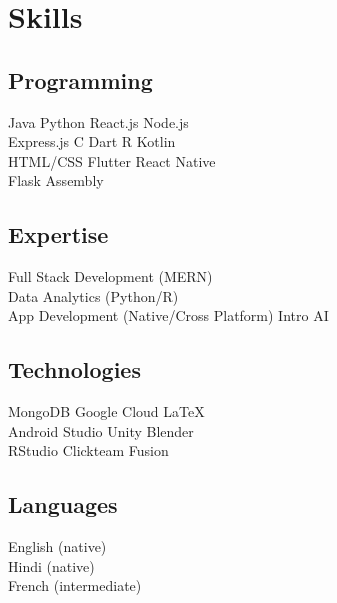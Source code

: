 \documentclass[]{saumya-resume}
\begin{document}
\begin{minipage}[t]{0.33\textwidth}

\section{Skills}
\subsection{Programming}
Java \textbullet{}   Python \textbullet{} React.js \textbullet{} Node.js \\
Express.js \textbullet{} C \textbullet{} Dart \textbullet{} R \textbullet{} Kotlin \textbullet{} \\ 
HTML/CSS \textbullet{} Flutter \textbullet{} React Native \\
Flask \textbullet{} Assembly
\sectionsep

\subsection{Expertise}
Full Stack Development (MERN) \textbullet{} \\
Data Analytics (Python/R) \textbullet{} \\
App Development (Native/Cross Platform) \textbullet{} Intro AI \\
\sectionsep

\subsection{Technologies}
MongoDB \textbullet{} Google Cloud \textbullet{} \LaTeX \\
Android Studio \textbullet{} Unity \textbullet{} Blender \\
RStudio \textbullet{} Clickteam Fusion \\
\sectionsep

\subsection{Languages}
English (native) \\
Hindi (native) \\
French (intermediate)
\sectionsep

%
%

\end{minipage} 
\hfill
\end{document}
